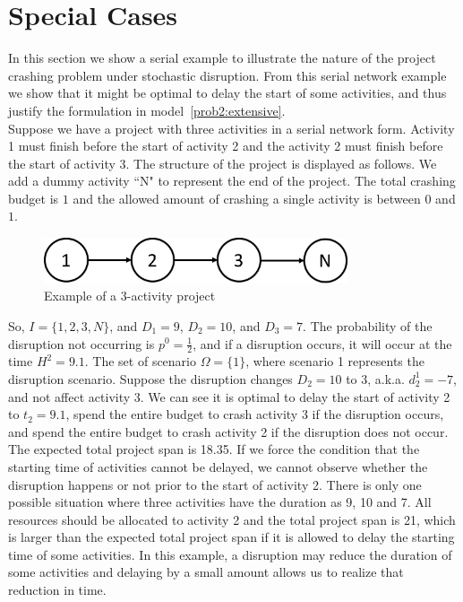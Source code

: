 \documentclass[11pt]{article}
\newcommand{\noi}{\noindent}
\begin{document}
\section{Special Cases} \label{sec:examples}
	In this section we show a serial example to illustrate the nature of the project crashing problem under stochastic disruption. From this serial network example we show that it might be optimal to delay the start of some activities, and thus justify the formulation in model~\eqref{prob2:extensive}. \\
	\newline
	Suppose we have a project with three activities in a serial network form. Activity 1 must finish before the start of activity 2 and the activity 2 must finish before the start of activity 3. The structure of the project is displayed as follows. We add a dummy activity ``N" to represent the end of the project. The total crashing budget is \(1\) and the allowed amount of crashing a single activity is between \(0\) and \(1\). 
	\begin{figure}[H]
		\centering
		\includegraphics[width=0.8\textwidth]{serial3}
		\caption{Example of a 3-activity project}
		\label{fig:serial3}
	\end{figure}
	\noi So, \(I=\{1,2,3,N\}\), and \(D_1=9\), \(D_2=10\), and \(D_3=7\). The probability of the disruption not occurring is \(p^0=\frac{1}{2}\), and if a disruption occurs, it will occur at the time \(H^2 = 9.1\). The set of scenario \(\Omega = \{1\}\), where scenario 1 represents the disruption scenario. Suppose the disruption changes \(D_2=10\) to \(3\), a.k.a. \(d_2^1 = -7\), and not affect activity 3. We can see it is optimal to delay the start of activity 2 to \(t_2 = 9.1\), spend the entire budget to crash activity 3 if the disruption occurs, and spend the entire budget to crash activity 2 if the disruption does not occur. The expected total project span is 18.35. If we force the condition that the starting time of activities cannot be delayed, we cannot observe whether the disruption happens or not prior to the start of activity 2. There is only one possible situation where three activities have the duration as 9, 10 and 7. All resources should be allocated to activity 2 and the total project span is 21, which is larger than the expected total project span if it is allowed to delay the starting time of some activities. In this example, a disruption may reduce the duration of some activities and delaying by a small amount allows us to realize that reduction in time.\\
\end{document}
